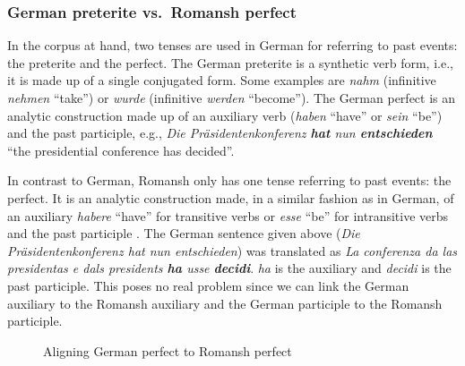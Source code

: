 \subsubsection{German preterite vs.~Romansh perfect}
In the corpus at hand, two tenses are used in German for referring to past events: the preterite and the perfect. 
The German preterite is a synthetic verb form, i.e., it is made up of a single conjugated form. 
Some examples are \emph{nahm} (infinitive \emph{nehmen} \enquote{take}) or \emph{wurde} (infinitive \emph{werden} \enquote{become}). 
The German perfect is an analytic construction made up of an auxiliary verb (\emph{haben} \enquote{have} or \emph{sein} \enquote{be}) and the past participle, e.g., \emph{Die Präsidentenkonferenz \textbf{hat} nun \textbf{entschieden}} \enquote{the presidential conference has decided}. 

In contrast to German, Romansh only has one tense referring to past events: the perfect. 
It is an analytic construction made, in a similar fashion as in German, of an auxiliary \emph{habere} \enquote{have} for transitive verbs or \emph{esse} \enquote{be} for intransitive verbs and the past participle \autocite[189]{bossong2008}. 
The German sentence given above (\emph{Die Präsidentenkonferenz hat nun entschieden}) was translated as \emph{La conferenza da las presidentas e dals presidents \textbf{ha} usse \textbf{decidi}}. 
\emph{ha} is the auxiliary and \emph{decidi} is the past participle. 
This poses no real problem since we can link the German auxiliary to the Romansh auxiliary and the German participle to the Romansh participle.

\begin{figure}
\centering
            
        
        \vspace*{1cm}
        
             
            

    
\caption{Aligning German perfect to Romansh perfect}
\end{figure}


